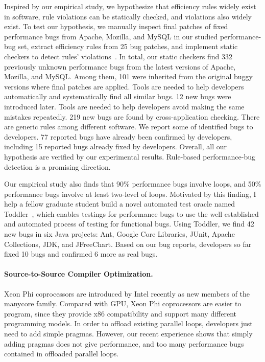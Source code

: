 \documentclass[10pt]{article}
\begin{document}
Inspired by our empirical study, we hypothesize that 
efficiency rules widely exist in software, 
rule violations can be statically checked, 
and violations also widely exist. 
To test our hypothesis, we manually inspect final patches of fixed performance bugs from Apache, Mozilla, and MySQL in our studied performance-bug set, 
extract efficiency rules from 25 bug patches, 
and implement static checkers to detect rules' violations~\cite{jin12perfbug}. 
In total, our static checkers find 332 previously unknown performance bugs from the latest versions of Apache, Mozilla, and MySQL. 
Among them, 101 were inherited from the original buggy versions where final patches are applied. 
Tools are needed to help developers automatically and systematically find all similar bugs. 
12 new bugs were introduced later. 
Tools are needed to help developers avoid making the same mistakes repeatedly. 
219 new bugs are found by cross-application checking. There are generic rules among different software. 
We report some of identified bugs to developers. 
77 reported bugs have already been confirmed by developers, including 15 reported bugs already fixed by developers. 
Overall, all our hypothesis are verified by our experimental results. Rule-based performance-bug detection is a promising direction.

Our empirical study also finds that 90\% performance bugs involve loops, 
and 50\% performance bugs involve at least two-level of loops. 
Motivated by this finding, I help a fellow graduate student build a novel automated test oracle named Toddler~\cite{Nistor13ICSE}, 
which enables testings for performance bugs to use the well established and automated process of testing for functional bugs. 
Using Toddler, we find 42 new bugs in six Java projects: 
Ant, Google Core Libraries, JUnit, Apache Collections, JDK, and JFreeChart. 
Based on our bug reports, developers so far fixed 10 bugs and confirmed 6 more as real bugs.


\paragraph{Source-to-Source Compiler Optimization.}
Xeon Phi coprocessors are introduced by Intel recently as new members of the manycore family. 
Compared with GPU, Xeon Phi coprocessors are easier to program, 
since they provide x86 compatibility and support many different programming models. 
In order to offload existing parallel loops, developers just need to add simple pragmas. 
However, our recent experience shows that simply adding pragmas does not give performance, 
and too many performance bugs contained in offloaded parallel loops. 
\end{document}
